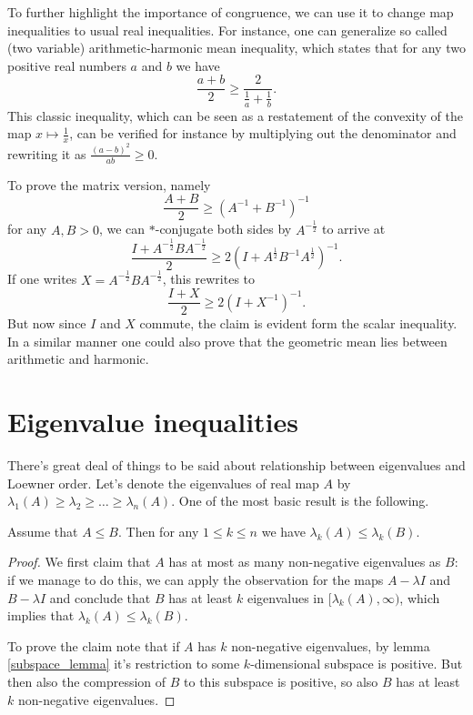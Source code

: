 To further highlight the importance of congruence, we can use it to change map inequalities to usual real inequalities. For instance, one can generalize so called (two variable) arithmetic-harmonic mean inequality, which states that for any two positive real numbers $a$ and $b$ we have
\[
	\frac{a + b}{2} \geq \frac{2}{\frac{1}{a} + \frac{1}{b}}.
\]
This classic inequality, which can be seen as a restatement of the convexity of the map $x \mapsto \frac{1}{x}$, can be verified for instance by multiplying out the denominator and rewriting it as $\frac{(a - b)^{2}}{ab} \geq 0$.

To prove the matrix version, namely
\[
	\frac{A + B}{2} \geq (A^{-1} + B^{-1})^{-1}
\]
for any $A, B > 0$, we can $*$-conjugate both sides by $A^{-\frac{1}{2}}$ to arrive at
\[
	\frac{I + A^{-\frac{1}{2}}B A^{-\frac{1}{2}}}{2} \geq 2 (I + A^{\frac{1}{2}}B^{-1} A^{\frac{1}{2}})^{-1}.
\]
If one writes $X = A^{-\frac{1}{2}}B A^{-\frac{1}{2}}$, this rewrites to
\[
	\frac{I + X}{2} \geq 2 (I + X^{-1})^{-1}.
\]
But now since $I$ and $X$ commute, the claim is evident form the scalar inequality. In a similar manner one could also prove that the geometric mean lies between arithmetic and harmonic.

\section{Eigenvalue inequalities}

There's great deal of things to be said about relationship between eigenvalues and Loewner order. Let's denote the eigenvalues of real map $A$ by $\lambda_{1}(A) \geq \lambda_{2} \geq \ldots \geq \lambda_{n}(A)$. One of the most basic result is the following.

\begin{prop}\label{loewner_eigenvalues}
	Assume that $A \leq B$. Then for any $1 \leq k \leq n$ we have $\lambda_{k}(A) \leq \lambda_{k}(B)$.
\end{prop}
\begin{proof}
	We first claim that $A$ has at most as many non-negative eigenvalues as $B$: if we manage to do this, we can apply the observation for the maps $A - \lambda I$ and $B - \lambda I$ and conclude that $B$ has at least $k$ eigenvalues in $[\lambda_{k}(A), \infty)$, which implies that $\lambda_{k}(A) \leq \lambda_{k}(B)$.

	To prove the claim note that if $A$ has $k$ non-negative eigenvalues, by lemma \ref{subspace_lemma} it's restriction to some $k$-dimensional subspace is positive. But then also the compression of $B$ to this subspace is positive, so also $B$ has at least $k$ non-negative eigenvalues.
\end{proof}

